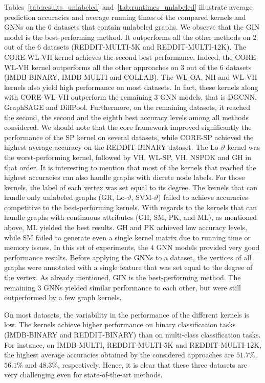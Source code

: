 \documentclass[twoside,11pt]{article}
\begin{document}
Tables~\ref{tab:results_unlabeled} and~\ref{tab:runtimes_unlabeled} illustrate average prediction accuracies and average running times of the compared kernels and GNNs on the $6$ datasets that contain unlabeled graphs.
We observe that the GIN model is the best-performing method.
It outperforms all the other methods on $2$ out of the $6$ datasets (REDDIT-MULTI-5K and REDDIT-MULTI-12K).
The CORE-WL-VH kernel achieves the second best performance.
Indeed, the CORE-WL-VH kernel outperforms all the other approaches on $3$ out of the $6$ datasets (IMDB-BINARY, IMDB-MULTI and COLLAB).
The WL-OA, NH and WL-VH kernels also yield high performance on most datasets.
In fact, these kernels along with CORE-WL-VH outperform the remaining $3$ GNN models, that is DGCNN, GraphSAGE and DiffPool.
Furthermore, on the remaining datasets, it reached the second, the second and the eighth best accuracy levels among all methods considered.
We should note that the core framework improved significantly the performance of the SP kernel on several datasets, while CORE-SP achieved the highest average accuracy on the REDDIT-BINARY dataset.
The Lo-$\vartheta$ kernel was the worst-performing kernel, followed by VH, WL-SP, VH, NSPDK and GH in that order.
It is interesting to mention that most of the kernels that reached the highest accuracies can also handle graphs with dicrete node labels.
For those kernels, the label of each vertex was set equal to its degree.
The kernels that can handle only unlabeled graphs (GR, Lo-$\vartheta$, SVM-$\vartheta$) failed to achieve accuracies competitive to the best-performing kernels.
With regards to the kernels that can handle graphs with continuous attributes (GH, SM, PK, and ML), as mentioned above, ML yielded the best results.
GH and PK achieved low accuracy levels, while SM failed to generate even a single kernel matrix due to running time or memory issues.
In this set of experiments, the $4$ GNN models provided very good performance results.
Before applying the GNNs to a dataset, the vertices of all graphs were annotated with a single feature that was set equal to the degree of the vertex.
As already mentioned, GIN is the best-performing method.
The remaining $3$ GNNs yielded similar performance to each other, but were still outperformed by a few graph kernels.

On most datasets, the variability in the performance of the different kernels is low.
The kernels achieve higher performance on binary classification tasks (IMDB-BINARY and REDDIT-BINARY) than on multi-class classification tasks.
For instance, on IMDB-MULTI, REDDIT-MULTI-5K and REDDIT-MULTI-12K, the highest average accuracies obtained by the considered approaches are $51.7\%$, $56.1\%$ and $48.3\%$, respectively.
Hence, it is clear that these three datasets are very challenging even for state-of-the-art methods.
\end{document}
